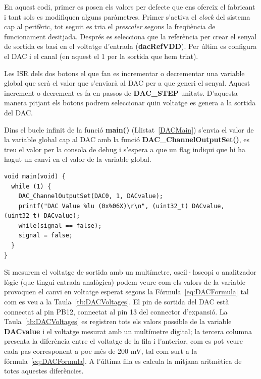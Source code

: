 En aquest codi, primer es posen els valors per defecte que ens ofereix el fabricant i tant sols es modifiquen alguns paràmetres. Primer s'activa el {\em clock} del sistema cap al perifèric, tot seguit es tria el {\em prescaler} segons la freqüència de funcionament desitjada.  Després es selecciona que la referència per crear el senyal de sortida es basi en el voltatge d'entrada ({\bf dacRefVDD}). Per últim es configura el DAC i el canal (en aquest el 1 per la sortida que hem triat).

Les \gls{ISR} dels dos botons el que fan es incrementar o decrementar una variable global que serà el valor que s'enviarà al DAC per a que generi el senyal. Aquest increment o decrement es fa en passos de {\bf DAC\_STEP} unitats. D'aquesta manera pitjant els botons podrem seleccionar quin voltatge es genera a la sortida del DAC.

Dins el bucle infinit de la funció {\bf main()} (Llistat~\ref{DACMain}) s'envia el valor de la variable global cap al DAC amb la funció {\bf DAC\_ChannelOutputSet()}, es treu el valor per la consola de debug i s'espera a que un \gls{flag} indiqui que hi ha hagut un canvi en el valor de la variable global.

\begin{lstlisting}[style=customc, caption=Bucle infinit del DAC, label=DACMain]
void main(void) {
  while (1) {
    DAC_ChannelOutputSet(DAC0, 1, DACvalue);
    printf("DAC Value %lu (0x%06X)\r\n", (uint32_t) DACvalue, (uint32_t) DACvalue);
    while(signal == false);
    signal = false;
  }
}
\end{lstlisting}

Si mesurem el voltatge de sortida amb un multímetre, oscil·loscopi o analitzador lògic (que tingui entrada analògica) podem veure com els valors de la variable provoquen el canvi en voltatge esperat segons la Fórmula~\ref{eq:DACFormula} tal com es veu a la Taula~\ref{tb:DACVoltages}. El pin de sortida del DAC està connectat al pin PB12, connectat al pin 13 del connector d'expansió. La Taula~\ref{tb:DACVoltages} es registren tots els valors possible de la variable {\bf DACvalue} i el voltatge mesurat amb un multímetre digital; la tercera columna presenta la diferència entre el voltatge de la fila i l'anterior, com es pot veure cada pas corresponent a poc més de 200 mV, tal com surt a la fórmula~\ref{eq:DACFormula}. A l'última fila es calcula la mitjana aritmètica de totes aquestes diferències.


